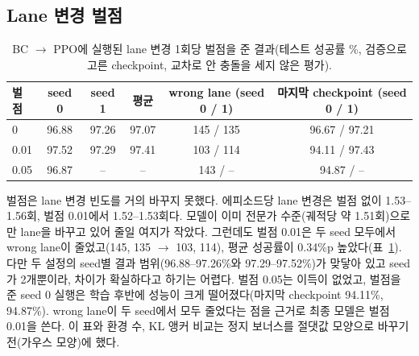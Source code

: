 \documentclass[10pt,a4paper]{article}
\begin{document}
\subsection{Lane 변경 벌점}\label{sec:penalty}
\begin{table}[h]
\centering
\caption{BC $\rightarrow$ PPO에 실행된 lane 변경 1회당 벌점을 준 결과(테스트 성공률 \%, 검증으로 고른 checkpoint, 교차로 안 충돌을 세지 않은 평가).}
\label{tab:penalty}
\small
\begin{tabular}{@{}lccccc@{}}
\toprule
벌점 & seed 0 & seed 1 & 평균 & wrong lane (seed 0 / 1) & 마지막 checkpoint (seed 0 / 1) \\
\midrule
0 & 96.88 & 97.26 & 97.07 & 145 / 135 & 96.67 / 97.21 \\
0.01 & 97.52 & 97.29 & 97.41 & 103 / 114 & 94.11 / 97.43 \\
0.05 & 96.87 & -- & -- & 143 / -- & 94.87 / -- \\
\bottomrule
\end{tabular}
\end{table}
벌점은 lane 변경 빈도를 거의 바꾸지 못했다. 에피소드당 lane 변경은 벌점 없이 1.53--1.56회, 벌점 0.01에서 1.52--1.53회다. 모델이 이미 전문가 수준(궤적당 약 1.51회)으로만 lane을 바꾸고 있어 줄일 여지가 작았다.
그런데도 벌점 0.01은 두 seed 모두에서 wrong lane이 줄었고(145, 135 $\rightarrow$ 103, 114), 평균 성공률이 0.34\%p 높았다(표~\ref{tab:penalty}). 다만 두 설정의 seed별 결과 범위(96.88--97.26\%와 97.29--97.52\%)가 맞닿아 있고 seed가 2개뿐이라, 차이가 확실하다고 하기는 어렵다. 벌점 0.05는 이득이 없었고, 벌점을 준 seed 0 실행은 학습 후반에 성능이 크게 떨어졌다(마지막 checkpoint 94.11\%, 94.87\%).
wrong lane이 두 seed에서 모두 줄었다는 점을 근거로 최종 모델은 벌점 0.01을 쓴다. 이 표와 환경 수, KL 앵커 비교는 정지 보너스를 절댓값 모양으로 바꾸기 전(가우스 모양)에 했다.
\end{document}
